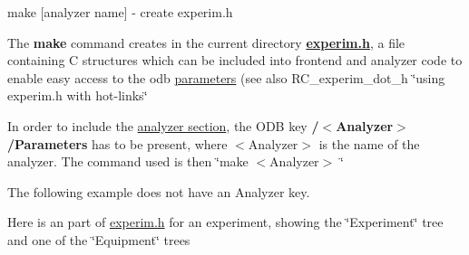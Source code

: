 \begin{DoxyCode}
make [analyzer name]    - create experim.h
\end{DoxyCode}
 The {\bfseries make} command creates in the current directory {\bfseries \hyperlink{experim_8h}{experim.h}}, a file containing C structures which can be included into frontend and analyzer code to enable easy access to the odb \hyperlink{structparameters}{parameters} (see also RC\_\-experim\_\-dot\_\-h \char`\"{}using experim.h with hot-\/links\char`\"{} \par
 In order to include the \hyperlink{DataAnalysis_DA_analyzer_utility}{analyzer section}, the ODB key {\bfseries /$<$Analyzer$>$/Parameters} has to be present, where $<$Analyzer$>$ is the name of the analyzer. The command used is then \char`\"{}make $<$Analyzer$>$ \char`\"{} \par
 The following example does not have an Analyzer key. 
 Here is an part of \hyperlink{experim_8h}{experim.h} for an experiment, showing the \char`\"{}Experiment\char`\"{} tree and one of the \char`\"{}Equipment\char`\"{} trees 
